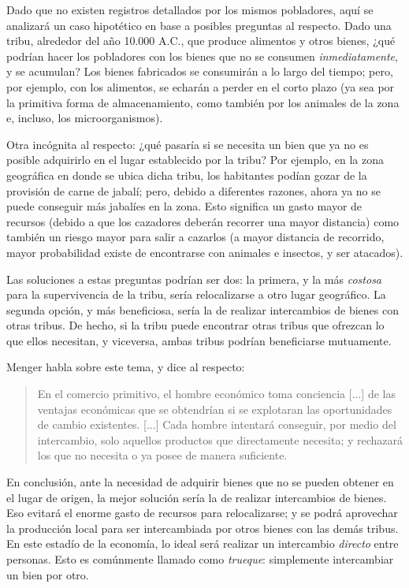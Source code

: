 \documentclass[12pt,a4paper,twoside]{book}
\begin{document}
Dado que no existen registros detallados por los mismos pobladores, aquí se analizará un caso hipotético en base a posibles preguntas al respecto. Dado una tribu, alrededor del año 10.000 A.C., que produce alimentos y otros bienes, ¿qué podrían hacer los pobladores con los bienes que no se consumen \textit{inmediatamente}, y se acumulan? Los bienes fabricados se consumirán a lo largo del tiempo; pero, por ejemplo, con los alimentos, se echarán a perder en el corto plazo (ya sea por la primitiva forma de almacenamiento, como también por los animales de la zona e, incluso, los microorganismos).

Otra incógnita al respecto: ¿qué pasaría si se necesita un bien que ya no es posible adquirirlo en el lugar establecido por la tribu? Por ejemplo, en la zona geográfica en donde se ubica dicha tribu, los habitantes podían gozar de la provisión de carne de jabalí; pero, debido a diferentes razones, ahora ya no se puede conseguir más jabalíes en la zona. Esto significa un gasto mayor de recursos (debido a que los cazadores deberán recorrer una mayor distancia) como también un riesgo mayor para salir a cazarlos (a mayor distancia de recorrido, mayor probabilidad existe de encontrarse con animales e insectos, y ser atacados).

Las soluciones a estas preguntas podrían ser dos: la primera, y la más \textit{costosa} para la supervivencia de la tribu, sería relocalizarse a otro lugar geográfico. La segunda opción, y más beneficiosa, sería la de realizar intercambios de bienes con otras tribus. De hecho, si la tribu puede encontrar otras tribus que ofrezcan lo que ellos necesitan, y viceversa, ambas tribus podrían beneficiarse mutuamente.

Menger habla sobre este tema, y dice al respecto:

\begin{quotation}
En el comercio primitivo, el hombre económico toma conciencia [...] de las ventajas económicas que se obtendrían si se explotaran las oportunidades de cambio existentes. [...] Cada hombre intentará conseguir, por medio del intercambio, solo aquellos productos que directamente necesita; y rechazará los que no necesita o ya posee de manera suficiente. \cite[pág. 242]{menger:origen}
\end{quotation}

En conclusión, ante la necesidad de adquirir bienes que no se pueden obtener en el lugar de origen, la mejor solución sería la de realizar intercambios de bienes. Eso evitará el enorme gasto de recursos para relocalizarse; y se podrá aprovechar la producción local para ser intercambiada por otros bienes con las demás tribus. En este estadío de la economía, lo ideal será realizar un intercambio \textit{directo} entre personas. Esto es comúnmente llamado como \textit{trueque}: simplemente intercambiar un bien por otro.
\end{document}
